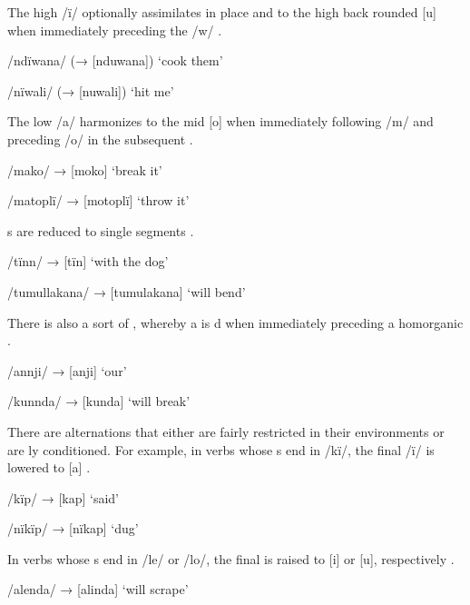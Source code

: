 The high  /ï/ optionally assimilates in place and  to the high back rounded  [u] when immediately preceding the  /w/ .

\ea%
    \label{ex:overview:7}
    \ea  /ndïwana/    (→ [nduwana])  ‘cook them’

    \ex  /nïwali/    (→ [nuwali])    ‘hit me’
    \z
\z

The  low  /a/ harmonizes to the  mid  [o] when immediately following  /m/ and preceding /o/ in the subsequent  .

\ea%
    \label{ex:overview:8}
    \ea  /mako/      → [moko]      ‘break it’

    \ex  /matoplï/    → [motoplï]    ‘throw it’
    \z
\z

\newpage

 s are reduced to single segments .

\ea%
    \label{ex:overview:9}
    \ea  /tïnn/      → [tïn]      ‘with the dog’

    \ex  /tumullakana/  → [tumulakana]  ‘will bend’
    \z
\z

There is also a sort of , whereby a   is d when immediately preceding a  homorganic    .

\ea%
    \label{ex:overview:10}
    \ea  /annji/      → [anji]      ‘our’

    \ex   /kunnda/    → [kunda]      ‘will break’
    \z
\z

There are  alternations that either are fairly restricted in their environments or are ly conditioned. For example, in  verbs whose s end in /kï/, the final /ï/ is lowered to [a] .

\ea%
    \label{ex:overview:11}
    \ea  /kïp/      → [kap]      ‘said’

    \ex  /nïkïp/      → [nïkap]      ‘dug’
    \z
\z

In  verbs whose s end in /le/ or /lo/, the final  is raised to [i] or [u], respectively .

\ea%
    \label{ex:overview:12}
    \ea  /alenda/    → [alinda]      ‘will scrape’

